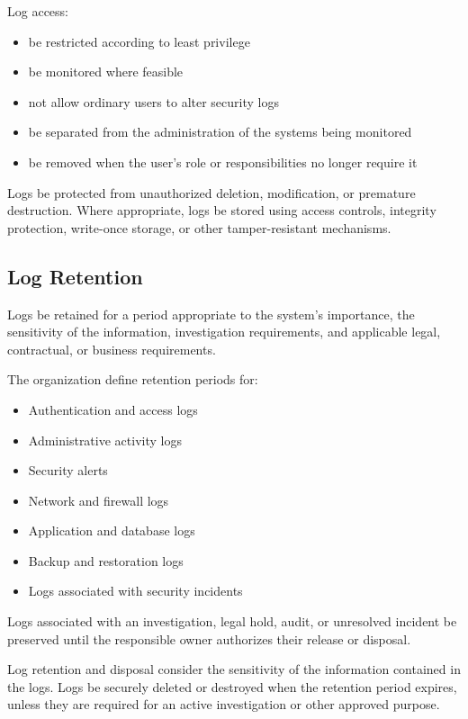 Log access:
\begin{itemize}
    \item \must{} be restricted according to least privilege
    \item \must{} be monitored where feasible
    \item \must{} not allow ordinary users to alter security logs
    \item \should{} be separated from the administration of the systems being monitored
    \item \must{} be removed when the user's role or responsibilities no longer require it
\end{itemize}

Logs \must{} be protected from unauthorized deletion, modification, or premature destruction. Where appropriate, logs \should{} be stored using access controls, integrity protection, write-once storage, or other tamper-resistant mechanisms.

\subsection{Log Retention}

Logs \must{} be retained for a period appropriate to the system's importance, the sensitivity of the information, investigation requirements, and applicable legal, contractual, or business requirements.

The organization \should{} define retention periods for:
\begin{itemize}
    \item Authentication and access logs
    \item Administrative activity logs
    \item Security alerts
    \item Network and firewall logs
    \item Application and database logs
    \item Backup and restoration logs
    \item Logs associated with security incidents
\end{itemize}

Logs associated with an investigation, legal hold, audit, or unresolved incident \must{} be preserved until the responsible owner authorizes their release or disposal.

Log retention and disposal \must{} consider the sensitivity of the information contained in the logs. Logs \must{} be securely deleted or destroyed when the retention period expires, unless they are required for an active investigation or other approved purpose.


